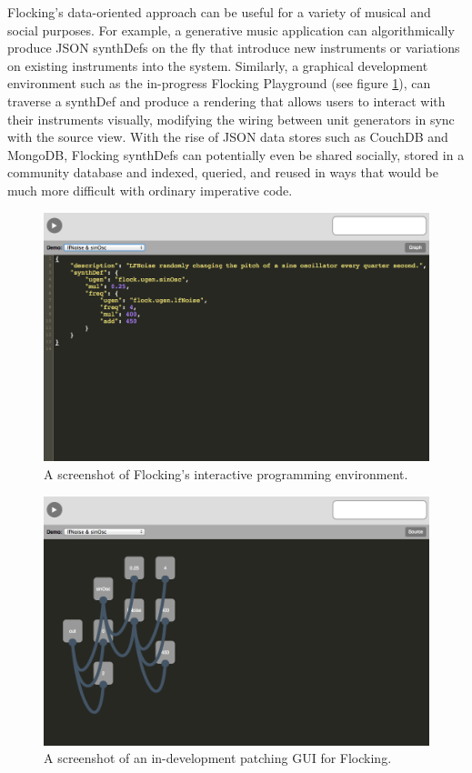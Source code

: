 \documentclass{article}
\begin{document}
Flocking's data-oriented approach can be useful for a variety of musical and social purposes. For example, a generative music application can algorithmically produce JSON synthDefs on the fly that introduce new instruments or variations on existing instruments into the system. Similarly, a graphical development environment such as the in-progress Flocking Playground (see figure \ref{fig:playground}), can traverse a synthDef and produce a rendering that allows users to interact with their instruments visually, modifying the wiring between unit generators in sync with the source view. With the rise of JSON data stores such as CouchDB and MongoDB, Flocking synthDefs can potentially even be shared socially, stored in a community database and indexed, queried, and reused in ways that would be much more difficult with ordinary imperative code.

\begin{figure}[ht!]
\centering
\includegraphics[width=0.9\columnwidth]{images/flocking-playground-source-view.png}
\caption{ A screenshot of Flocking's interactive programming environment.\label{fig:playground}}
\end{figure}

\begin{figure}[ht]
\centering
\includegraphics[width=0.9\columnwidth]{images/flocking-playground-graphical-view.png}
\caption{ A screenshot of an in-development patching GUI for Flocking.\label{fig:graphical}}
\end{figure}
\end{document}

